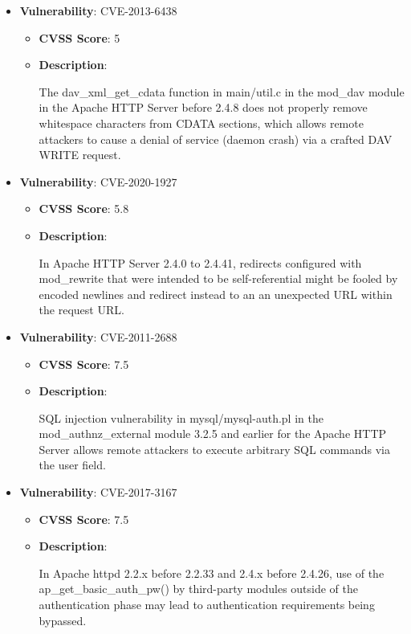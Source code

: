 \documentclass{article}
\begin{document}
\begin{itemize}
        \item \textbf{Vulnerability}: CVE-2013-6438
        \begin{itemize}
            \item \textbf{CVSS Score}:  5 
            \item \textbf{Description}:
            \parbox[t]{0.9\linewidth}{
                \ttfamily The dav\_xml\_get\_cdata function in main/util.c in the mod\_dav module in the Apache HTTP Server before 2.4.8 does not properly remove whitespace characters from CDATA sections, which allows remote attackers to cause a denial of service (daemon crash) via a crafted DAV WRITE request.
            }
        \end{itemize}
    
        \item \textbf{Vulnerability}: CVE-2020-1927
        \begin{itemize}
            \item \textbf{CVSS Score}:  5.8 
            \item \textbf{Description}:
            \parbox[t]{0.9\linewidth}{
                \ttfamily In Apache HTTP Server 2.4.0 to 2.4.41, redirects configured with mod\_rewrite that were intended to be self-referential might be fooled by encoded newlines and redirect instead to an an unexpected URL within the request URL.
            }
        \end{itemize}
    
        \item \textbf{Vulnerability}: CVE-2011-2688
        \begin{itemize}
            \item \textbf{CVSS Score}:  7.5 
            \item \textbf{Description}:
            \parbox[t]{0.9\linewidth}{
                \ttfamily SQL injection vulnerability in mysql/mysql-auth.pl in the mod\_authnz\_external module 3.2.5 and earlier for the Apache HTTP Server allows remote attackers to execute arbitrary SQL commands via the user field.
            }
        \end{itemize}
    
        \item \textbf{Vulnerability}: CVE-2017-3167
        \begin{itemize}
            \item \textbf{CVSS Score}:  7.5 
            \item \textbf{Description}:
            \parbox[t]{0.9\linewidth}{
                \ttfamily In Apache httpd 2.2.x before 2.2.33 and 2.4.x before 2.4.26, use of the ap\_get\_basic\_auth\_pw() by third-party modules outside of the authentication phase may lead to authentication requirements being bypassed.
            }
        \end{itemize}
    

\end{itemize}
\end{document}
